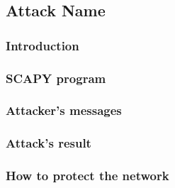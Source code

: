 \subsection{Attack Name}
\subsubsection{Introduction}


\subsubsection{SCAPY program}
%

\subsubsection{Attacker's messages}

\subsubsection{Attack's result}


\subsubsection{How to protect the network}
